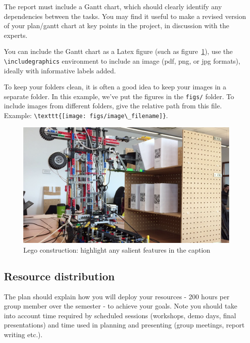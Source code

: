 \documentclass{article}
\begin{document}
The report must include a Gantt chart, which should clearly identify any dependencies between the tasks. You may find it useful to make a revised version of your plan/gantt chart at key points in the project, in discussion with the experts. 

You can include the Gantt chart as a Latex figure (such as figure~\ref{fig:sample-fig}), use the \verb+\includegraphics+ environment to include an image (pdf, png, or jpg formats), ideally with informative labels added. 

To keep your folders clean, it is often a good idea to keep your images in a separate folder. In this example, we've put the figures in the \texttt{figs/} folder. To include images from different folders, give the relative path from this file. Example: \verb+\texttt{[image: figs/image\_filename]}+.

\begin{figure}[tb]
\vskip 5mm
\begin{center}
\centerline{\includegraphics[width=\columnwidth]{figs/crane}}
\caption{Lego construction: highlight any salient features in the caption}
\label{fig:sample-fig}
\end{center}
\vskip -5mm
\end{figure} 


\subsection{Resource distribution}
The plan should explain how you will deploy your resources - 200 hours per group member over the semester - to achieve your goals. Note you should take into account time required by scheduled sessions (workshops, demo days, final presentations) and time used in planning and presenting (group meetings, report writing etc.). 
\end{document}
